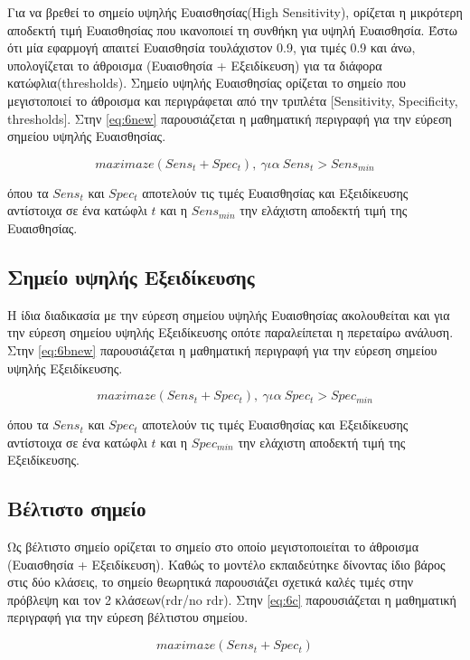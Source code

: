 Για να βρεθεί το σημείο υψηλής Ευαισθησίας(High Sensitivity), ορίζεται η μικρότερη αποδεκτή τιμή  Ευαισθησίας που ικανοποιεί τη συνθήκη για υψηλή Ευαισθησία. Έστω ότι μία εφαρμογή απαιτεί Ευαισθησία τουλάχιστον 0.9, για τιμές 0.9 και άνω, υπολογίζεται το άθροισμα (Ευαισθησία  + Εξειδίκευση) για τα διάφορα κατώφλια(thresholds). Σημείο υψηλής Ευαισθησίας ορίζεται το σημείο που μεγιστοποιεί το άθροισμα και περιγράφεται από την τριπλέτα [Sensitivity, Specificity, thresholds]. Στην \ref{eq:6new} παρουσιάζεται η μαθηματική περιγραφή για την εύρεση σημείου υψηλής Ευαισθησίας. 




\begin{equation} \label{eq:6new}
maximaze(Sens_{t} + Spec_{t}),~ για~ Sens_{t}>Sens_{min}
\end{equation}

όπου τα $Sens_{t}$ και $Spec_{t}$ αποτελούν τις τιμές Ευαισθησίας και Εξειδίκευσης αντίστοιχα σε ένα κατώφλι $t$ και η $Sens_{min}$ την ελάχιστη αποδεκτή τιμή της Ευαισθησίας.


\subsection{Σημείο υψηλής Εξειδίκευσης}
\label{subsec:6.3.2}
Η ίδια διαδικασία με την εύρεση σημείου υψηλής Ευαισθησίας ακολουθείται και για την εύρεση σημείου υψηλής Εξειδίκευσης οπότε παραλείπεται η περεταίρω ανάλυση. Στην \ref{eq:6bnew} παρουσιάζεται η μαθηματική περιγραφή για την εύρεση σημείου υψηλής Εξειδίκευσης. 


\begin{equation} \label{eq:6bnew}
maximaze(Sens_{t} + Spec_{t}),~ για~ Spec_{t}>Spec_{min}
\end{equation}

όπου τα $Sens_{t}$ και $Spec_{t}$ αποτελούν τις τιμές Ευαισθησίας και Εξειδίκευσης αντίστοιχα σε ένα κατώφλι $t$ και η $Spec_{min}$ την ελάχιστη αποδεκτή τιμή της Εξειδίκευσης.



\subsection{Βέλτιστο σημείο}
\label{subsec:6.3.3}
Ως βέλτιστο σημείο ορίζεται το σημείο στο οποίο μεγιστοποιείται το άθροισμα (Ευαισθησία + Εξειδίκευση). Καθώς το μοντέλο εκπαιδεύτηκε δίνοντας ίδιο βάρος στις δύο κλάσεις, το σημείο θεωρητικά παρουσιάζει σχετικά καλές τιμές στην πρόβλεψη και τον 2 κλάσεων(rdr/no rdr). Στην \ref{eq:6c} παρουσιάζεται η μαθηματική περιγραφή για την εύρεση βέλτιστου σημείου.


\begin{equation} \label{eq:6c}
maximaze(Sens_{t} + Spec_{t})
\end{equation}


  


